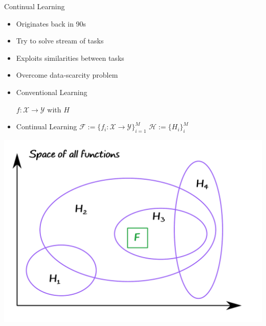 \documentclass[aspectratio=169]{beamer}
\begin{document}
\begin{frame}{Continual Learning}
  \begin{minipage}{0.5\textwidth}
    {
      \begin{itemize}
        \item Originates back in 90s
        \item Try to solve stream of tasks
        \item Exploits similarities between tasks 
        \item Overcome data-scarcity problem
      \end{itemize}
    }
    {
      \begin{itemize}
        \item Conventional Learning 

          $f:\mathcal{X}\to\mathcal{Y}$ with $H$
        \item Continual Learning $\mathcal{F}:=\{f_i:\mathcal{X}\to\mathcal{Y}\}_{i=1}^M$ $\mathcal{H}:=\{H_i\}_i^M$
      \end{itemize}
    }
  \end{minipage}%
  \begin{minipage}{0.5\textwidth}
    \includegraphics[width=\textwidth]{figures/space_lll.pdf} 
  \end{minipage}
\end{frame}
\end{document}
